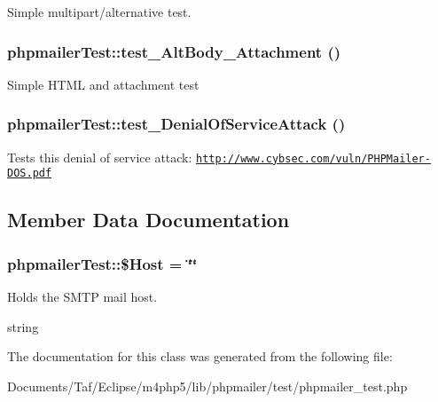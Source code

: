 Simple multipart/alternative test. \hypertarget{classphpmailerTest_76332327e357d6a5c534cd21397e51e3}{
\subsubsection[test\_\-AltBody\_\-Attachment]{\setlength{\rightskip}{0pt plus 5cm}phpmailerTest::test\_\-AltBody\_\-Attachment ()}}
\label{classphpmailerTest_76332327e357d6a5c534cd21397e51e3}


Simple HTML and attachment test \hypertarget{classphpmailerTest_cb35f31f4260304f6f0771c61ab59992}{
\subsubsection[test\_\-DenialOfServiceAttack]{\setlength{\rightskip}{0pt plus 5cm}phpmailerTest::test\_\-DenialOfServiceAttack ()}}
\label{classphpmailerTest_cb35f31f4260304f6f0771c61ab59992}


Tests this denial of service attack: \href{http://www.cybsec.com/vuln/PHPMailer-DOS.pdf}{\tt http://www.cybsec.com/vuln/PHPMailer-DOS.pdf} 

\subsection{Member Data Documentation}
\hypertarget{classphpmailerTest_efe5f111278483561370865caa8a0048}{
\subsubsection[\$Host]{\setlength{\rightskip}{0pt plus 5cm}phpmailerTest::\$Host = \char`\"{}\char`\"{}}}
\label{classphpmailerTest_efe5f111278483561370865caa8a0048}


Holds the SMTP mail host.

string 

The documentation for this class was generated from the following file:\begin{CompactItemize}
\item 
Documents/Taf/Eclipse/m4php5/lib/phpmailer/test/phpmailer\_\-test.php\end{CompactItemize}
